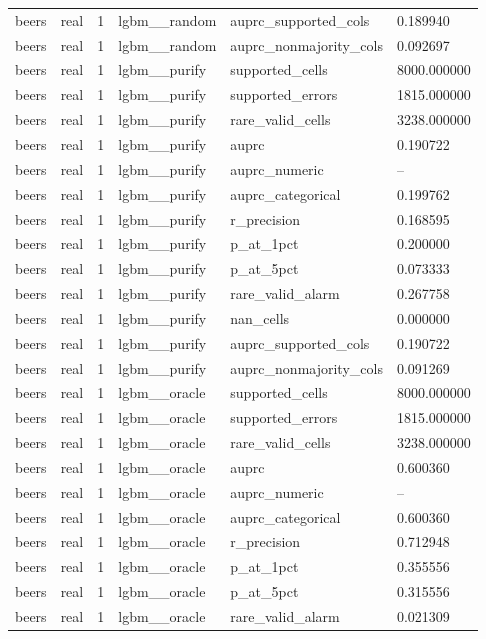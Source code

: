 \begin{tabular}{llllll}
beers & real & 1 & lgbm\_\_random & auprc\_supported\_cols & 0.189940 \\
beers & real & 1 & lgbm\_\_random & auprc\_nonmajority\_cols & 0.092697 \\
beers & real & 1 & lgbm\_\_purify & supported\_cells & 8000.000000 \\
beers & real & 1 & lgbm\_\_purify & supported\_errors & 1815.000000 \\
beers & real & 1 & lgbm\_\_purify & rare\_valid\_cells & 3238.000000 \\
beers & real & 1 & lgbm\_\_purify & auprc & 0.190722 \\
beers & real & 1 & lgbm\_\_purify & auprc\_numeric & -- \\
beers & real & 1 & lgbm\_\_purify & auprc\_categorical & 0.199762 \\
beers & real & 1 & lgbm\_\_purify & r\_precision & 0.168595 \\
beers & real & 1 & lgbm\_\_purify & p\_at\_1pct & 0.200000 \\
beers & real & 1 & lgbm\_\_purify & p\_at\_5pct & 0.073333 \\
beers & real & 1 & lgbm\_\_purify & rare\_valid\_alarm & 0.267758 \\
beers & real & 1 & lgbm\_\_purify & nan\_cells & 0.000000 \\
beers & real & 1 & lgbm\_\_purify & auprc\_supported\_cols & 0.190722 \\
beers & real & 1 & lgbm\_\_purify & auprc\_nonmajority\_cols & 0.091269 \\
beers & real & 1 & lgbm\_\_oracle & supported\_cells & 8000.000000 \\
beers & real & 1 & lgbm\_\_oracle & supported\_errors & 1815.000000 \\
beers & real & 1 & lgbm\_\_oracle & rare\_valid\_cells & 3238.000000 \\
beers & real & 1 & lgbm\_\_oracle & auprc & 0.600360 \\
beers & real & 1 & lgbm\_\_oracle & auprc\_numeric & -- \\
beers & real & 1 & lgbm\_\_oracle & auprc\_categorical & 0.600360 \\
beers & real & 1 & lgbm\_\_oracle & r\_precision & 0.712948 \\
beers & real & 1 & lgbm\_\_oracle & p\_at\_1pct & 0.355556 \\
beers & real & 1 & lgbm\_\_oracle & p\_at\_5pct & 0.315556 \\
beers & real & 1 & lgbm\_\_oracle & rare\_valid\_alarm & 0.021309 \\

\end{tabular}
